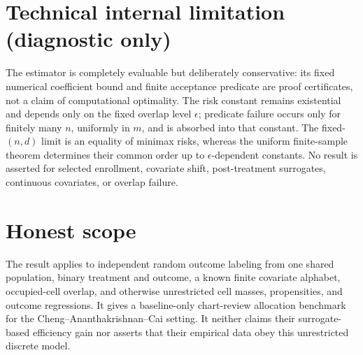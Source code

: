 \documentclass{article}
\begin{document}
\section*{Technical internal limitation (diagnostic only)}

The estimator is completely evaluable but deliberately conservative: its fixed numerical coefficient bound and finite acceptance predicate are proof certificates, not a claim of computational optimality.  The risk constant remains existential and depends only on the fixed overlap level \(\epsilon\); predicate failure occurs only for finitely many \(n\), uniformly in \(m\), and is absorbed into that constant.  The fixed-\((n,d)\) limit is an equality of minimax risks, whereas the uniform finite-sample theorem determines their common order up to \(\epsilon\)-dependent constants.  No result is asserted for selected enrollment, covariate shift, post-treatment surrogates, continuous covariates, or overlap failure.

\section{Honest scope}

The result applies to independent random outcome labeling from one shared population, binary treatment and outcome, a known finite covariate alphabet, occupied-cell overlap, and otherwise unrestricted cell masses, propensities, and outcome regressions.  It gives a baseline-only chart-review allocation benchmark for the Cheng--Ananthakrishnan--Cai setting.  It neither claims their surrogate-based efficiency gain nor asserts that their empirical data obey this unrestricted discrete model.
\end{document}
